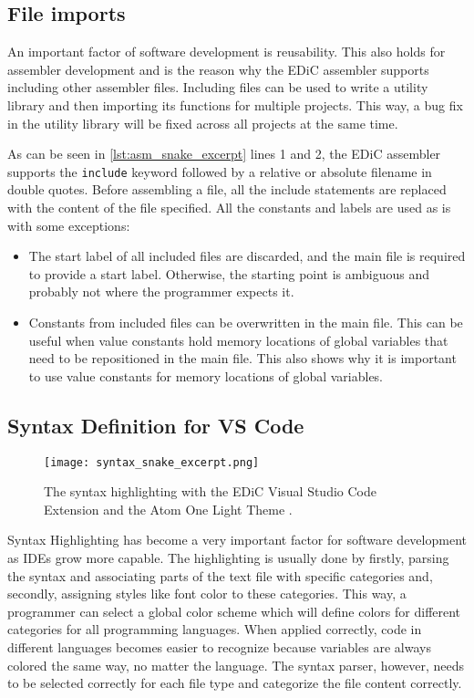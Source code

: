 \subsection{File imports}\label{sec:imports}
An important factor of software development is reusability.
This also holds for assembler development and is the reason why the \gls{EDiC} assembler supports including other assembler files.
Including files can be used to write a utility library and then importing its functions for multiple projects.
This way, a bug fix in the utility library will be fixed across all projects at the same time.

As can be seen in \cref{lst:asm_snake_excerpt} lines 1 and 2, the \gls{EDiC} assembler supports the \texttt{include} keyword followed by a relative or absolute filename in double quotes.
Before assembling a file, all the include statements are replaced with the content of the file specified.
All the constants and labels are used as is with some exceptions:
\begin{itemize}
  \item The start label of all included files are discarded, and the main file is required to provide a start label.
        Otherwise, the starting point is ambiguous and probably not where the programmer expects it.
  \item Constants from included files can be overwritten in the main file.
        This can be useful when value constants hold memory locations of global variables that need to be repositioned in the main file.
        This also shows why it is important to use value constants for memory locations of global variables.
\end{itemize}


\subsection{Syntax Definition for VS Code}
\begin{figure}[t]
  \centering
  \texttt{[image: syntax\_snake\_excerpt.png]}
  \caption{The syntax highlighting with the \gls{EDiC} Visual Studio Code Extension and the Atom One Light Theme \cite{VSCodeLight}.}
  \label{fig:SyntaxEDiC}
\end{figure}
Syntax Highlighting has become a very important factor for software development as \glspl{IDE} grow more capable.
The highlighting is usually done by firstly, parsing the syntax and associating parts of the text file with specific categories and, secondly, assigning styles like font color to these categories.
This way, a programmer can select a global color scheme which will define colors for different categories for all programming languages.
When applied correctly, code in different languages becomes easier to recognize because variables are always colored the same way, no matter the language.
The syntax parser, however, needs to be selected correctly for each file type and categorize the file content correctly.

